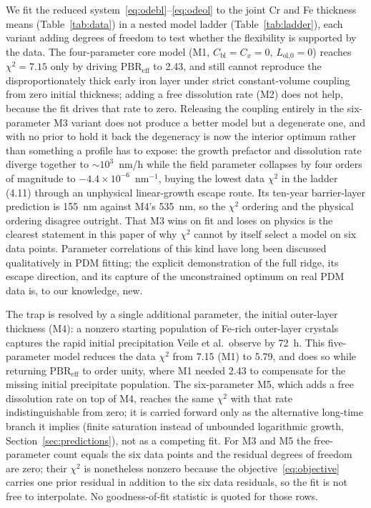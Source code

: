 \documentclass[a4paper,fleqn]{cas-sc}
\begin{document}
We fit the reduced system~\eqref{eq:odebl}--\eqref{eq:odeol} to the
joint Cr and Fe thickness means (Table~\ref{tab:data}) in a nested model
ladder
(Table~\ref{tab:ladder}), each variant adding degrees of freedom to
test whether the flexibility is supported by the data. The
four-parameter core model (M1, $C_\text{bl}=C_x=0$,
$L_\text{ol,0}=0$) reaches $\chi^2 = 7.15$ only by driving
$\mathrm{PBR}_\text{eff}$ to 2.43, and still cannot reproduce the
disproportionately thick early iron layer under strict constant-volume
coupling from zero initial thickness; adding a free dissolution rate
(M2) does not help, because the fit drives that rate to zero. Releasing
the coupling entirely in the six-parameter M3 variant does not produce a
better model but a degenerate one, and with no prior to hold it back the
degeneracy is now the interior optimum rather than something a profile
has to expose: the growth prefactor and dissolution rate diverge
together to $\sim\!10^{3}$~nm/h while the field parameter
collapses by four orders of magnitude to
$-4.4\times10^{-6}$~nm$^{-1}$, buying the lowest data $\chi^2$ in the
ladder (4.11) through an unphysical linear-growth escape route. Its
ten-year barrier-layer prediction is 155~nm against M4's 535~nm, so the
$\chi^2$ ordering and the physical ordering disagree outright. That M3
wins on fit and loses on physics is the clearest statement in this paper
of why $\chi^2$ cannot by itself select a model on six data points.
Parameter correlations of this kind have long been discussed
qualitatively in PDM fitting; the explicit demonstration of the full
ridge, its escape direction, and its capture of the unconstrained
optimum on real PDM data is, to our knowledge, new.

The trap is resolved by a single additional parameter, the initial
outer-layer thickness (M4): a nonzero starting population of Fe-rich
outer-layer crystals captures the rapid initial precipitation Veile et
al.\ observe by 72~h. This five-parameter model reduces the data
$\chi^2$ from 7.15 (M1) to 5.79, and does so while returning
$\mathrm{PBR}_\text{eff}$ to order unity, where M1 needed 2.43 to
compensate for the missing initial precipitate population. The six-parameter M5, which adds a
free dissolution rate on top of M4, reaches the same $\chi^2$ with that
rate indistinguishable from zero; it is carried forward only as the
alternative long-time branch it implies (finite saturation instead of
unbounded logarithmic growth, Section~\ref{sec:predictions}), not as a
competing fit. For M3 and M5 the free-parameter count equals the six
data points and the residual degrees of freedom are zero; their $\chi^2$
is nonetheless nonzero because the objective~\eqref{eq:objective} carries
one prior residual in addition to the six data residuals, so the fit is
not free to interpolate. No goodness-of-fit statistic is quoted for those
rows.
\end{document}
